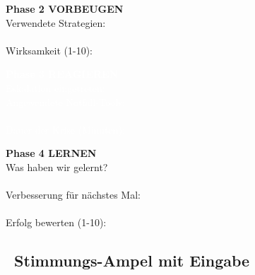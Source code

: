 \begin{ctmmOrangeBox}{}
\textbf{Phase 2 VORBEUGEN}\\
Verwendete Strategien:\\
 \quad {} \quad {} \quad {}\\[0.2cm]
Wirksamkeit (1-10): 
\end{ctmmOrangeBox}

\begin{ctmmRedBox}{}
\textcolor{white}{\textbf{Phase 3 REAGIEREN}}\\
\textcolor{white}{Eskalation eingetreten:} \\[0.2cm]
\textcolor{white}{Angewendete Notfall-Tools:}\\
 \quad {} \quad {}\\[0.2cm]
\textcolor{white}{Dauer der Krise (Minuten):} 
\end{ctmmRedBox}

\begin{ctmmPurpleBox}{}
\textbf{Phase 4 LERNEN}\\
Was haben wir gelernt?\\
\\[0.3cm]
Verbesserung für nächstes Mal:\\
\\[0.3cm]
Erfolg bewerten (1-10): 
\end{ctmmPurpleBox}

\subsection*{\faChartLine~Stimmungs-Ampel mit Eingabe}

